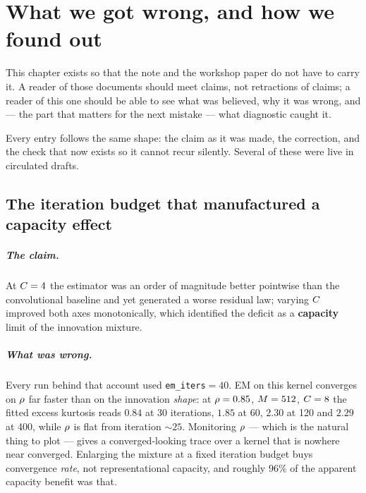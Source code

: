 \chapter{What we got wrong, and how we found out}
\label{ch:corrections}

This chapter exists so that the note and the workshop paper do not have to carry it. A reader of
those documents should meet claims, not retractions of claims; a reader of this one should be
able to see what was believed, why it was wrong, and --- the part that matters for the next
mistake --- what diagnostic caught it.

Every entry follows the same shape: the claim as it was made, the correction, and the check that
now exists so it cannot recur silently. Several of these were live in circulated drafts.

\section{The iteration budget that manufactured a capacity effect}
\label{sec:corr-capacity}

\paragraph{The claim.} At $C=4$ the estimator was an order of magnitude better pointwise
than the convolutional baseline and yet generated a worse residual law; varying $C$ improved
both axes monotonically, which identified the deficit as a \textbf{capacity} limit of the
innovation mixture.

\paragraph{What was wrong.} Every run behind that account used \texttt{em\_iters}${}=40$. EM on
this kernel converges on $\rho$ far faster than on the innovation \emph{shape}: at $\rho=0.85$,
$M=512$, $C=8$ the fitted excess kurtosis reads $0.84$ at 30 iterations, $1.85$ at 60,
$2.30$ at 120 and $2.29$ at 400, while $\rho$ is flat from iteration ${\sim}25$. Monitoring
$\rho$ --- which is the natural thing to plot --- gives a converged-looking trace over a kernel
that is nowhere near converged. Enlarging the mixture at a fixed iteration budget buys
convergence \emph{rate}, not representational capacity, and roughly $96\%$ of the apparent
capacity benefit was that.

